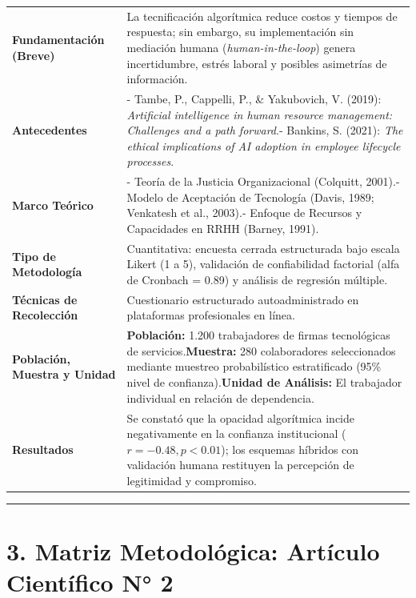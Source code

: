 \documentclass[
  spanish,
  letterpaper,
  DIV=11,
  numbers=noendperiod]{scrartcl}
\begin{document}
{\begin{longtable}[]{@{}
  >{\raggedright\arraybackslash}p{}
  >{\raggedright\arraybackslash}p{}@{}}
\textbf{Fundamentación (Breve)} & La tecnificación algorítmica reduce
costos y tiempos de respuesta; sin embargo, su implementación sin
mediación humana (\emph{human-in-the-loop}) genera incertidumbre, estrés
laboral y posibles asimetrías de información. \\
\textbf{Antecedentes} & - Tambe, P., Cappelli, P., \& Yakubovich, V.
(2019): \emph{Artificial intelligence in human resource management:
Challenges and a path forward}.- Bankins, S. (2021): \emph{The ethical
implications of AI adoption in employee lifecycle processes}. \\
\textbf{Marco Teórico} & - Teoría de la Justicia Organizacional
(Colquitt, 2001).- Modelo de Aceptación de Tecnología (Davis, 1989;
Venkatesh et al., 2003).- Enfoque de Recursos y Capacidades en RRHH
(Barney, 1991). \\
\textbf{Tipo de Metodología} & Cuantitativa: encuesta cerrada
estructurada bajo escala Likert (1 a 5), validación de confiabilidad
factorial (alfa de Cronbach = 0.89) y análisis de regresión múltiple. \\
\textbf{Técnicas de Recolección} & Cuestionario estructurado
autoadministrado en plataformas profesionales en línea. \\
\textbf{Población, Muestra y Unidad} & \textbf{Población:} 1.200
trabajadores de firmas tecnológicas de servicios.\textbf{Muestra:} 280
colaboradores seleccionados mediante muestreo probabilístico
estratificado (95\% nivel de confianza).\textbf{Unidad de Análisis:} El
trabajador individual en relación de dependencia. \\
\textbf{Resultados} & Se constató que la opacidad algorítmica incide
negativamente en la confianza institucional (\(r = -0.48, p < 0.01\));
los esquemas híbridos con validación humana restituyen la percepción de
legitimidad y compromiso. \\
\end{longtable}
}

\begin{center}\rule{0.5\linewidth}{0.5pt}\end{center}

\section{3. Matriz Metodológica: Artículo Científico N°
2}\label{matriz-metodoluxf3gica-artuxedculo-cientuxedfico-n-2}
\end{document}
